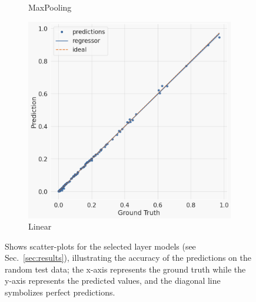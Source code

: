 \begin{figure}[h]
\begin{subfigure}[b]{0.47\textwidth}
            \caption[]%
            {{\small MaxPooling}}    
            \label{fig:layer-scatterplots maxpooling}
        \end{subfigure}
        \begin{subfigure}[b]{0.47\textwidth}   
            \centering 
            \includegraphics[width=\textwidth]{resources/scatter-linear.png}
            \caption[]%
            {{\small Linear}}    
            \label{fig:layer-scatterplots linear}
        \end{subfigure}
        \caption[Shows scatter-plots for the selected layer models (see Sec.~\ref{sec:results}), illustrating the accuracy of the predictions on the random test data; the x-axis represents the ground truth while the y-axis represents the predicted values, and the diagonal line symbolizes perfect predictions.]
        {Shows scatter-plots for the selected layer models (see Sec.~\ref{sec:results}), illustrating the accuracy of the predictions on the random test data; the x-axis represents the ground truth while the y-axis represents the predicted values, and the diagonal line symbolizes perfect predictions.}
        \label{fig:layer-scatterplots-layers}
\end{figure}
